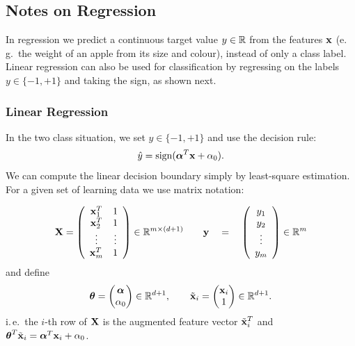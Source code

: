 \subsection{Notes on Regression}
In regression we predict a continuous target value $y\in\mathbb{R}$ from the features $\bm{\mathrm{x}}$ (e.\,g.\ the weight of an apple from its size and colour), instead of only a class label. Linear regression can also be used for classification by regressing on the labels $y\in\{-1,+1\}$ and taking the sign, as shown next.\autocite{hastie2009,bishop2006}

\subsubsection{Linear Regression}
In the two class situation, we set $y\in \{-1,+1\}$ and use the decision rule:
	\begin{displaymath}
		\hat y = \operatorname{sign}(\bm{\mathrm{\alpha}}^T\bm{\mathrm{x}} + \alpha_0).
	\end{displaymath}
	We can compute the linear decision boundary simply by least-square estimation. For a given set of learning data we use matrix notation:

	\begin{displaymath}
		\mathbf{X} = \left(
		\begin{array}{cc}
				\bm{\mathrm{x}}_1^T & 1      \\
				\bm{\mathrm{x}}_2^T & 1      \\
				\vdots     & \vdots \\
				\bm{\mathrm{x}}_m^T & 1
			\end{array}
		\right) \in \mathbb{R}^{m\times (d+1)} \qquad \bm{\mathrm{y}} \quad = \quad
		\left(
		\begin{array}{c}
				y_1    \\
				y_2    \\
				\vdots \\
				y_m    \\
			\end{array}
		\right) \in \mathbb{R}^m
	\end{displaymath}
	and define
	\begin{displaymath}
		\bm{\mathrm{\theta}} = \begin{pmatrix}\bm{\mathrm{\alpha}}\\ \alpha_0\end{pmatrix} \in \mathbb{R}^{d+1}, \qquad
		\tilde{\bm{\mathrm{x}}}_i = \begin{pmatrix}\bm{\mathrm{x}}_i\\ 1\end{pmatrix} \in \mathbb{R}^{d+1}.
	\end{displaymath}
	i.\,e.\ the $i$-th row of $\mathbf{X}$ is the augmented feature vector $\tilde{\bm{\mathrm{x}}}_i^T$ and $\bm{\mathrm{\theta}}^T\tilde{\bm{\mathrm{x}}}_i = \bm{\mathrm{\alpha}}^T\bm{\mathrm{x}}_i + \alpha_0$.

